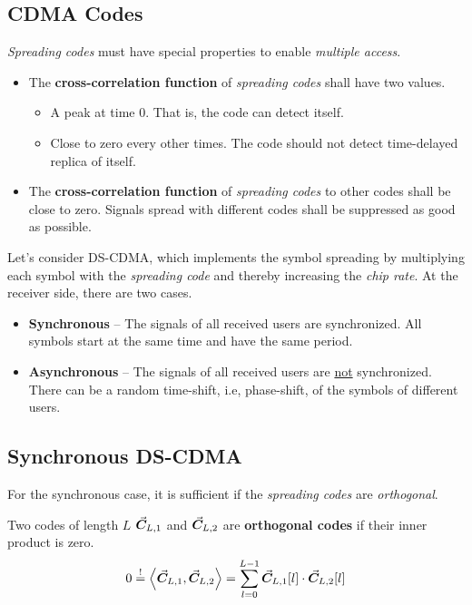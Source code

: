 \begin{refsection}
\section{CDMA Codes}

\emph{Spreading codes} must have special properties to enable \emph{multiple access}.
\begin{itemize}
	\item The  \textbf{cross-correlation function} of \emph{spreading codes} shall have two values.
	\begin{itemize}
		\item A peak at time $0$. That is, the code can detect itself.
		\item Close to zero every other times. The code should not detect time-delayed replica of itself.
	\end{itemize}
	\item The  \textbf{cross-correlation function} of \emph{spreading codes} to other codes shall be close to zero. Signals spread with different codes shall be suppressed as good as possible.
\end{itemize}

Let's consider \acs{DS-CDMA}, which implements the symbol spreading by multiplying each symbol with the \emph{spreading code} and thereby increasing the \emph{chip rate}. At the receiver side, there are two cases.
\begin{itemize}
	\item \textbf{Synchronous} -- The signals of all received users are synchronized. All symbols start at the same time and have the same period.
	\item \textbf{Asynchronous} -- The signals of all received users are \underline{not} synchronized. There can be a random time-shift, i.e, phase-shift, of the symbols of different users.
\end{itemize}

\subsection{Synchronous \acs{DS-CDMA}}

For the synchronous case, it is sufficient if the \emph{spreading codes} are \emph{orthogonal}.

Two codes of length $L$ $\vec{\bm{C}}_{L,1}$ and $\vec{\bm{C}}_{L,2}$ are  \textbf{orthogonal codes} if their inner product is zero.
\begin{equation}
	0 \stackrel{!}{=} \left\langle \vec{\bm{C}}_{L,1}, \vec{\bm{C}}_{L,2} \right\rangle = \sum\limits_{l = 0}^{L-1} \vec{\bm{C}}_{L,1}[l] \cdot \vec{\bm{C}}_{L,2}[l]
\end{equation}


\end{refsection}
